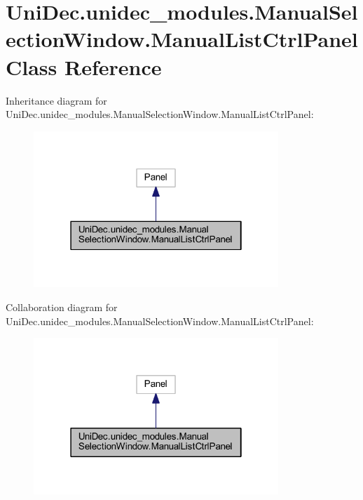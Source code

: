 \hypertarget{class_uni_dec_1_1unidec__modules_1_1_manual_selection_window_1_1_manual_list_ctrl_panel}{}\section{Uni\+Dec.\+unidec\+\_\+modules.\+Manual\+Selection\+Window.\+Manual\+List\+Ctrl\+Panel Class Reference}
\label{class_uni_dec_1_1unidec__modules_1_1_manual_selection_window_1_1_manual_list_ctrl_panel}


Inheritance diagram for Uni\+Dec.\+unidec\+\_\+modules.\+Manual\+Selection\+Window.\+Manual\+List\+Ctrl\+Panel\+:\nopagebreak
\begin{figure}[H]
\begin{center}
\leavevmode
\includegraphics[width=262pt]{class_uni_dec_1_1unidec__modules_1_1_manual_selection_window_1_1_manual_list_ctrl_panel__inherit__graph}
\end{center}
\end{figure}


Collaboration diagram for Uni\+Dec.\+unidec\+\_\+modules.\+Manual\+Selection\+Window.\+Manual\+List\+Ctrl\+Panel\+:\nopagebreak
\begin{figure}[H]
\begin{center}
\leavevmode
\includegraphics[width=262pt]{class_uni_dec_1_1unidec__modules_1_1_manual_selection_window_1_1_manual_list_ctrl_panel__coll__graph}
\end{center}
\end{figure}
